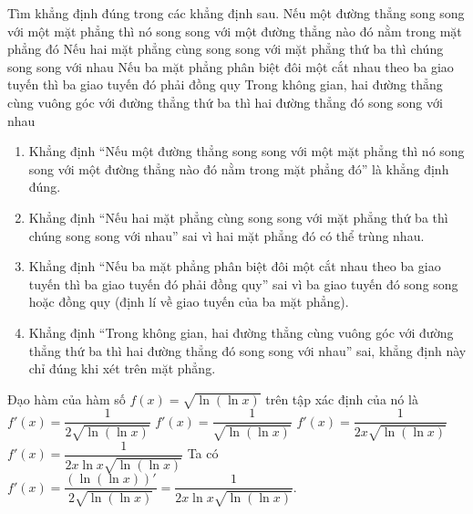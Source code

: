 \begin{ex}%
Tìm khẳng định đúng trong các khẳng định sau.
 \choice 
{\True Nếu một đường thẳng song song với một mặt phẳng thì nó song song với một đường thẳng nào đó nằm trong mặt phẳng đó}
{Nếu hai mặt phẳng cùng song song với mặt phẳng thứ ba thì chúng song song với nhau}
{Nếu ba mặt phẳng phân biệt đôi một cắt nhau theo ba giao tuyến thì ba giao tuyến đó phải đồng quy}
{Trong không gian, hai đường thẳng cùng vuông góc với đường thẳng thứ ba thì hai đường thẳng đó song song với nhau}
\loigiai
{
\begin{enumerate}
	\item Khẳng định ``Nếu một đường thẳng song song với một mặt phẳng thì nó song song với một đường thẳng nào đó nằm trong mặt phẳng đó'' là khẳng định đúng.
	\item Khẳng định ``Nếu hai mặt phẳng cùng song song với mặt phẳng thứ ba thì chúng song song với nhau'' sai vì hai mặt phẳng đó có thể trùng nhau.
	\item Khẳng định ``Nếu ba mặt phẳng phân biệt đôi một cắt nhau theo ba giao tuyến thì ba giao tuyến đó phải đồng quy'' sai vì ba giao tuyến đó song song hoặc đồng quy (định lí về giao tuyến của ba mặt phẳng).
	\item Khẳng định ``Trong không gian, hai đường thẳng cùng vuông góc với đường thẳng thứ ba thì hai đường thẳng đó song song với nhau'' sai, khẳng định này chỉ đúng khi xét trên mặt phẳng.
\end{enumerate}
}
\end{ex}

	
\begin{ex}%
Đạo hàm của hàm số $f(x) =\sqrt{\ln \left (\ln x\right )}$ trên tập xác định của nó là 
 \choice 
{$f'(x) =\dfrac{1}{2\sqrt{ \ln \left (\ln x\right )}}$}
{$f'(x) =\dfrac{1}{\sqrt{ \ln \left (\ln x\right )}}$}
{$f'(x) =\dfrac{1}{2x\sqrt{ \ln \left (\ln x\right )}}$}
{\True $f'(x) =\dfrac{1}{2x\ln x\sqrt{ \ln \left (\ln x\right )}}$}
\loigiai
{
Ta có $f'(x) =\dfrac{(\ln (\ln x))'}{2\sqrt{\ln (\ln x)}}=\dfrac{1}{2x\ln x\sqrt{ \ln \left (\ln x\right )}}$.
}
\end{ex}


